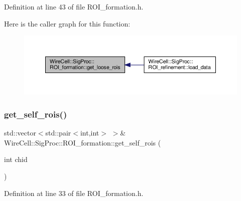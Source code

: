 Definition at line 43 of file R\+O\+I\+\_\+formation.\+h.

Here is the caller graph for this function\+:
\nopagebreak
\begin{figure}[H]
\begin{center}
\leavevmode
\includegraphics[width=350pt]{class_wire_cell_1_1_sig_proc_1_1_r_o_i__formation_a851997f497e0bdf05982e955d6d4007d_icgraph}
\end{center}
\end{figure}
\mbox{\label{class_wire_cell_1_1_sig_proc_1_1_r_o_i__formation_aa22dcb0af16abe3380c1d6c12c2d862d}} 
\subsubsection{\texorpdfstring{get\+\_\+self\+\_\+rois()}{get\_self\_rois()}}
{\footnotesize\ttfamily std\+::vector$<$std\+::pair$<$int,int$>$ $>$\& Wire\+Cell\+::\+Sig\+Proc\+::\+R\+O\+I\+\_\+formation\+::get\+\_\+self\+\_\+rois (\begin{DoxyParamCaption}\item[{int}]{chid }\end{DoxyParamCaption})\hspace{0.3cm}{\ttfamily [inline]}}



Definition at line 33 of file R\+O\+I\+\_\+formation.\+h.

